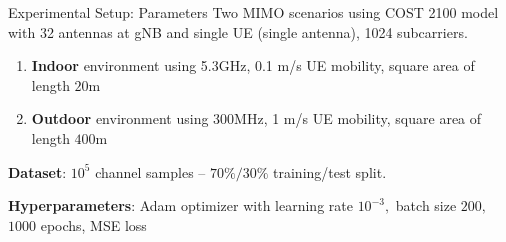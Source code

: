 \documentclass{beamer}
\begin{document}
  \begin{frame}{Experimental Setup: Parameters}
    Two MIMO scenarios using COST 2100 model with 32 antennas at gNB and single UE (single antenna), 1024 subcarriers.
    \begin{enumerate}
        \item \textbf{Indoor} environment using 5.3GHz, 0.1 m/s UE mobility, square area of length $20$m
        \item \textbf{Outdoor} environment using 300MHz, 1 m/s UE mobility, square area of length $400$m
    \end{enumerate}
    \textbf{Dataset}: $10^5$ channel samples -- $70\% / 30\% $ training/test split. %

    \textbf{Hyperparameters}: Adam optimizer with learning rate $10^{-3},$ batch size $200,$ $1000$ epochs, MSE loss
  \end{frame}
\end{document}
